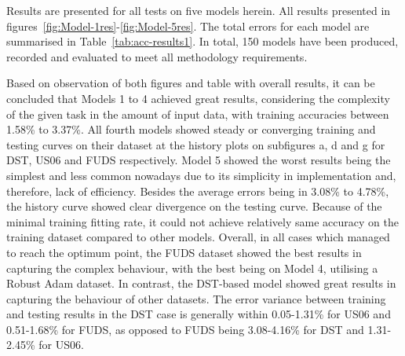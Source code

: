 
Results are presented for all tests on five models herein.
All results presented in figures~\ref{fig:Model-1res}-\ref{fig:Model-5res}.
The total errors for each model are summarised in Table~\ref{tab:acc-results1}.
In total, 150 models have been produced, recorded and evaluated to meet all methodology requirements.

Based on observation of both figures and table with overall results, it can be concluded that Models 1 to 4 achieved great results, considering the complexity of the given task in the amount of input data, with training accuracies between 1.58\% to 3.37\%.
All fourth models showed steady or converging training and testing curves on their dataset at the history plots on subfigures a, d and g for DST, US06 and FUDS respectively.
Model 5 showed the worst results being the simplest and less common nowadays due to its simplicity in implementation and, therefore, lack of efficiency.
Besides the average errors being in 3.08\% to 4.78\%, the history curve showed clear divergence on the testing curve. 
Because of the minimal training fitting rate, it could not achieve relatively same accuracy on the training dataset compared to other models.
Overall, in all cases which managed to reach the optimum point, the FUDS dataset showed the best results in capturing the complex behaviour, with the best being on Model 4, utilising a Robust Adam dataset.
In contrast, the DST-based model showed great results in capturing the behaviour of other datasets.
The error variance between training and testing results in the DST case is generally within 0.05-1.31\% for US06 and 0.51-1.68\% for FUDS, as opposed to FUDS being 3.08-4.16\% for DST and 1.31-2.45\% for US06.

